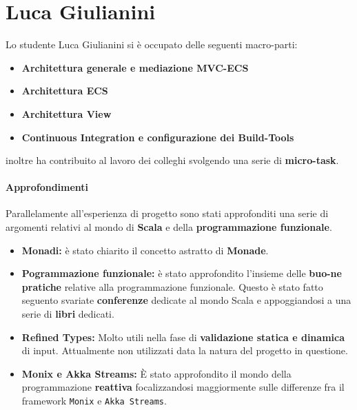 \section{Luca Giulianini}
Lo studente Luca Giulianini si è occupato delle seguenti macro-parti:
\begin{itemize}
	\item{\textbf{Architettura generale e mediazione MVC-ECS}}
	\item{\textbf{Architettura ECS}}
	\item{\textbf{Architettura View}}
	\item{\textbf{Continuous Integration e configurazione dei Build-Tools}}
\end{itemize}

inoltre ha contribuito al lavoro dei colleghi svolgendo una serie di \textbf{micro-task}.

\paragraph{Approfondimenti}
\label{par:approfondimenti}
Parallelamente all'esperienza di progetto sono stati approfonditi una serie di argomenti relativi al mondo di \textbf{Scala} e della \textbf{programmazione funzionale}. 
\begin{itemize}
	\item{\textbf{Monadi:}} è stato chiarito il concetto astratto di \textbf{Monade}.
	\item{\textbf{Pogrammazione funzionale:}} è stato approfondito l'insieme delle \textbf{buo-ne pratiche} relative alla programmazione funzionale. Questo è stato fatto seguento svariate \textbf{conferenze} dedicate al mondo Scala e appoggiandosi a una serie di \textbf{libri} dedicati. 
	\item{\textbf{Refined Types:}} Molto utili nella fase di \textbf{validazione statica e dinamica} di input. Attualmente non utilizzati data la natura del progetto in questione.
	\item{\textbf{Monix e Akka Streams:}} È stato approfondito il mondo della programmazione \textbf{reattiva} focalizzandosi maggiormente sulle differenze fra il framework \texttt{Monix} e \texttt{Akka Streams}.
\end{itemize}


